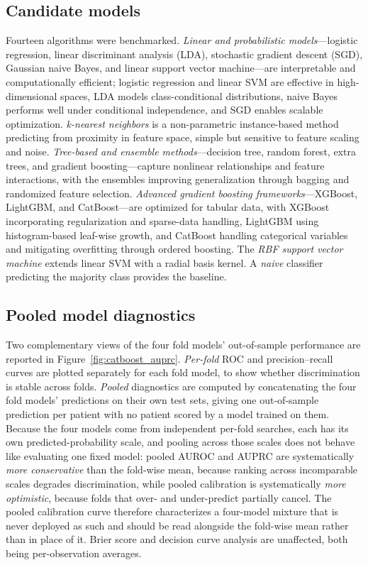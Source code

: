 \documentclass[pdflatex,sn-mathphys-num]{sn-jnl}%
\theoremstyle{thmstyleone}%
\theoremstyle{thmstyletwo}%
\theoremstyle{thmstylethree}%
\begin{document}
\begin{appendices}
\subsection{Candidate models}

Fourteen algorithms were benchmarked. \textit{Linear and probabilistic models}---logistic regression,
linear discriminant analysis (LDA), stochastic gradient descent (SGD), Gaussian naive Bayes, and
linear support vector machine---are interpretable and computationally efficient; logistic
regression and linear SVM are effective in high-dimensional spaces, LDA models class-conditional
distributions, naive Bayes performs well under conditional independence, and SGD enables scalable
optimization. \textit{k-nearest neighbors} is a non-parametric instance-based method predicting
from proximity in feature space, simple but sensitive to feature scaling and noise.
\textit{Tree-based and ensemble methods}---decision tree, random forest, extra trees, and gradient
boosting---capture nonlinear relationships and feature interactions, with the ensembles improving
generalization through bagging and randomized feature selection. \textit{Advanced gradient boosting
frameworks}---XGBoost, LightGBM, and CatBoost---are optimized for tabular data, with XGBoost
incorporating regularization and sparse-data handling, LightGBM using histogram-based leaf-wise
growth, and CatBoost handling categorical variables and mitigating overfitting through ordered
boosting. The \textit{RBF support vector machine} extends linear SVM with a radial basis kernel. A
\textit{naive} classifier predicting the majority class provides the baseline.

\subsection{Pooled model diagnostics}

Two complementary views of the four fold models' out-of-sample performance are reported in
Figure~\ref{fig:catboost_auprc}. \textit{Per-fold} ROC and precision--recall curves are plotted
separately for each fold model, to show whether discrimination is stable across folds.
\textit{Pooled} diagnostics are computed by concatenating the four fold models' predictions on their
own test sets, giving one out-of-sample prediction per patient with no patient scored by a model
trained on them. Because the four models come from independent per-fold searches, each has its own
predicted-probability scale, and pooling across those scales does not behave like evaluating one
fixed model: pooled AUROC and AUPRC are systematically \textit{more conservative} than the fold-wise
mean, because ranking across incomparable scales degrades discrimination, while pooled calibration is
systematically \textit{more optimistic}, because folds that over- and under-predict partially cancel.
The pooled calibration curve therefore characterizes a four-model mixture that is never deployed as
such and should be read alongside the fold-wise mean rather than in place of it. Brier score and
decision curve analysis are unaffected, both being per-observation averages.


\end{appendices}
\end{document}

